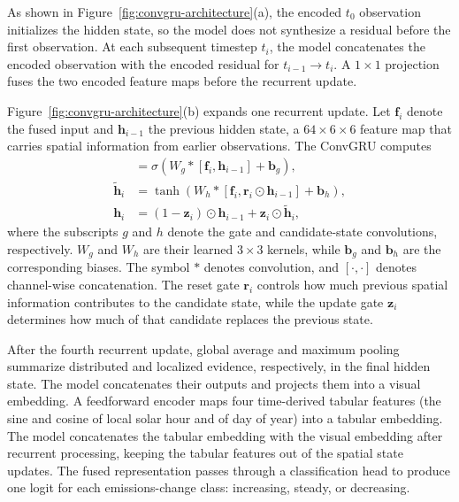 \documentclass[sigconf,nonacm]{acmart}
\begin{document}
As shown in Figure~\ref{fig:convgru-architecture}(a), the encoded $t_0$
observation initializes the hidden state, so the model does not synthesize a
residual before the first observation. At each subsequent timestep $t_i$, the
model concatenates the encoded observation with the encoded residual for
$t_{i-1}\rightarrow t_i$. A $1\times1$ projection fuses the two encoded
feature maps before the recurrent update.

Figure~\ref{fig:convgru-architecture}(b) expands one recurrent update. Let
$\boldsymbol{f}_i$ denote the fused input and $\boldsymbol{h}_{i-1}$ the
previous hidden state, a $64\times6\times6$ feature map that carries spatial
information from earlier observations. The ConvGRU computes
\begin{align}
  [\boldsymbol{r}_i,\boldsymbol{z}_i]
    &= \sigma\!\left(W_g *
       [\boldsymbol{f}_i,\boldsymbol{h}_{i-1}]+\boldsymbol{b}_g\right), \\
  \widetilde{\boldsymbol{h}}_i
    &= \tanh\!\left(W_h *
       [\boldsymbol{f}_i,\boldsymbol{r}_i\odot\boldsymbol{h}_{i-1}]
       +\boldsymbol{b}_h\right), \\
  \boldsymbol{h}_i
    &= (1-\boldsymbol{z}_i)\odot\boldsymbol{h}_{i-1}
       +\boldsymbol{z}_i\odot\widetilde{\boldsymbol{h}}_i,
\end{align}
where the subscripts $g$ and $h$ denote the gate and candidate-state
convolutions, respectively. $W_g$ and $W_h$ are their learned $3\times3$
kernels, while $\boldsymbol{b}_g$ and $\boldsymbol{b}_h$ are the corresponding
biases. The symbol $*$ denotes convolution, and $[\cdot,\cdot]$ denotes
channel-wise concatenation. The reset gate
$\boldsymbol{r}_i$ controls how much previous spatial information contributes
to the candidate state, while the update gate $\boldsymbol{z}_i$ determines
how much of that candidate replaces the previous state.

After the fourth recurrent update, global average and maximum pooling summarize
distributed and localized evidence, respectively, in the final hidden state.
The model concatenates their outputs and projects them into a visual embedding.
A feedforward encoder maps four time-derived tabular features (the sine and
cosine of local solar hour and of day of year) into a tabular embedding. The
model concatenates the tabular embedding with the visual embedding after
recurrent processing, keeping the tabular features out of the spatial state updates. The fused representation passes
through a classification head to produce one logit for each emissions-change class:
increasing, steady, or decreasing.
\end{document}
